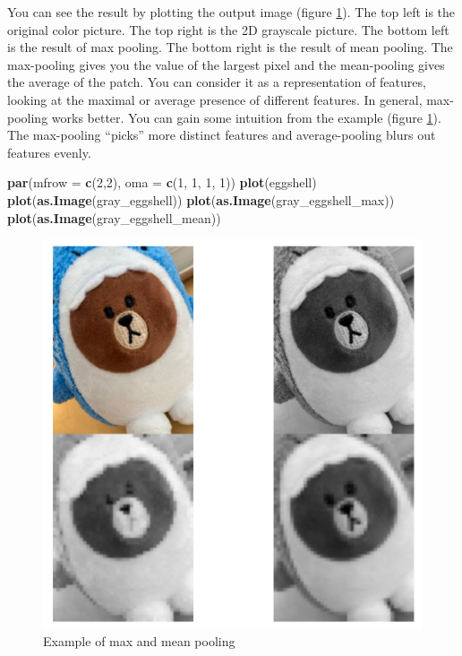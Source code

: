 \documentclass[12pt,]{krantz}
\makeatletter
\newenvironment{Shaded}{\begin{snugshade}}{\end{snugshade}}
\newcommand{\DataTypeTok}[1]{\textcolor[rgb]{0.27,0.27,0.27}{#1}}
\newcommand{\DecValTok}[1]{\textcolor[rgb]{0.06,0.06,0.06}{#1}}
\newcommand{\KeywordTok}[1]{\textcolor[rgb]{0.27,0.27,0.27}{\textbf{#1}}}
\newcommand{\NormalTok}[1]{#1}
\newenvironment{kframe}{%
\medskip{}
\setlength{\fboxsep}{.8em}
 \def\at@end@of@kframe{}%
 \ifinner\ifhmode%
  \def\at@end@of@kframe{\end{minipage}}%
  \begin{minipage}{\columnwidth}%
 \fi\fi%
 \def\FrameCommand##1{\hskip\@totalleftmargin \hskip-\fboxsep
 \colorbox{shadecolor}{##1}\hskip-\fboxsep
     \hskip-\linewidth \hskip-\@totalleftmargin \hskip\columnwidth}%
 \MakeFramed {\advance\hsize-\width
   \@totalleftmargin\z@ \linewidth\hsize
   \@setminipage}}%
 {\par\unskip\endMakeFramed%
 \at@end@of@kframe}
\renewenvironment{Shaded}{\begin{kframe}}{\end{kframe}}
\makeatother
\begin{document}
You can see the result by plotting the output image (figure \ref{fig:eggshellconv}). The top left is the original color picture. The top right is the 2D grayscale picture. The bottom left is the result of max pooling. The bottom right is the result of mean pooling. The max-pooling gives you the value of the largest pixel and the mean-pooling gives the average of the patch. You can consider it as a representation of features, looking at the maximal or average presence of different features. In general, max-pooling works better. You can gain some intuition from the example (figure \ref{fig:eggshellconv}). The max-pooling ``picks'' more distinct features and average-pooling blurs out features evenly.

\begin{Shaded}
\begin{Highlighting}[]
\KeywordTok{par}\NormalTok{(}\DataTypeTok{mfrow =} \KeywordTok{c}\NormalTok{(}\DecValTok{2}\NormalTok{,}\DecValTok{2}\NormalTok{), }\DataTypeTok{oma =} \KeywordTok{c}\NormalTok{(}\DecValTok{1}\NormalTok{, }\DecValTok{1}\NormalTok{, }\DecValTok{1}\NormalTok{, }\DecValTok{1}\NormalTok{))}
\KeywordTok{plot}\NormalTok{(eggshell)}
\KeywordTok{plot}\NormalTok{(}\KeywordTok{as.Image}\NormalTok{(gray_eggshell))}
\KeywordTok{plot}\NormalTok{(}\KeywordTok{as.Image}\NormalTok{(gray_eggshell_max))}
\KeywordTok{plot}\NormalTok{(}\KeywordTok{as.Image}\NormalTok{(gray_eggshell_mean))}
\end{Highlighting}
\end{Shaded}

\begin{figure}

{\centering \includegraphics[width=0.7\linewidth]{images/eggshellconv} 

}

\caption{Example of max and mean pooling}\label{fig:eggshellconv}
\end{figure}
\end{document}
